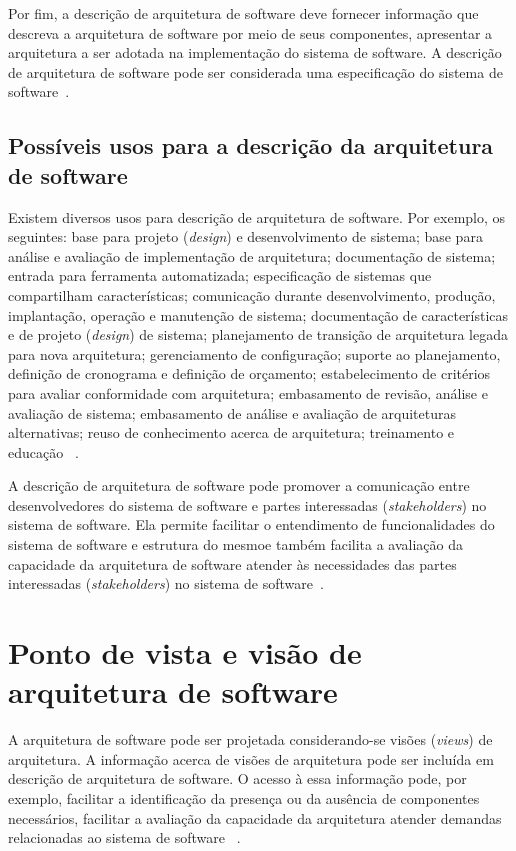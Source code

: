 Por fim, a descrição de arquitetura de software deve fornecer informação que descreva a arquitetura de software por meio de seus componentes, apresentar a arquitetura a ser adotada na implementação do sistema de software. A descrição de arquitetura de software pode ser considerada uma especificação do sistema de software~\cite{ISO_15289}.

\subsection{Possíveis usos para a descrição da arquitetura de software}

Existem diversos usos para descrição de arquitetura de software. Por exemplo, os seguintes: base para projeto (\emph{design}) e desenvolvimento de sistema; base para análise e avaliação de implementação de arquitetura; documentação de sistema; entrada para ferramenta automatizada; especificação de sistemas que compartilham características; comunicação durante desenvolvimento, produção, implantação, operação e manutenção de sistema; documentação de características e de projeto (\emph{design}) de sistema; planejamento de transição de arquitetura legada para nova arquitetura; gerenciamento de configuração; suporte ao planejamento, definição de cronograma e definição de orçamento; estabelecimento de critérios para avaliar conformidade com arquitetura; embasamento de revisão, análise e avaliação de sistema; embasamento de análise e avaliação de arquiteturas alternativas; reuso de conhecimento acerca de arquitetura; treinamento e educação ~\cite{ISO_42010}.

A descrição de arquitetura de software pode promover a comunicação entre desenvolvedores do sistema de software e partes interessadas (\emph{stakeholders}) no sistema de software. Ela permite  facilitar o entendimento de funcionalidades do sistema de software e estrutura do mesmoe também facilita a avaliação da capacidade da arquitetura de software atender às necessidades das partes interessadas (\emph{stakeholders}) no sistema de software~\cite{ISO_42010}. 

\section{Ponto de vista e visão de arquitetura de software}

A arquitetura de software pode ser projetada considerando-se visões (\emph{views}) de arquitetura. A informação acerca de visões de arquitetura pode ser incluída em descrição de arquitetura de software. O acesso à essa informação pode, por exemplo, facilitar a identificação da presença ou da ausência de componentes necessários, facilitar a avaliação da capacidade da arquitetura atender demandas relacionadas ao sistema de software ~\cite{ISO_42010}.

